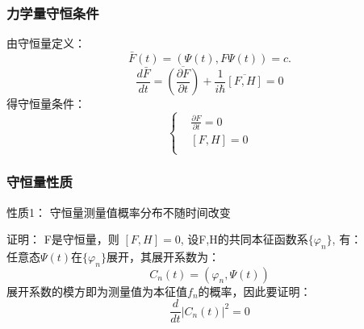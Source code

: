 \begin{frame} [allowframebreaks=]
        \frametitle{力学量守恒条件} 
        由守恒量定义：   
        $$ \bar{F}(t)=(\Psi(t), F\Psi(t)) =c.  $$
        $$\frac{d\bar{F}}{dt}=\overline{(\frac{\partial F }{\partial t})}  +\frac{1}{i\hbar} \overline{[F,H]}=0$$
        得守恒量条件：
        $$\left\{\begin{aligned}
            &\frac{\partial F }{\partial t}=0\\
            &[F,H]=0 \\
        \end{aligned} \right. $$
\end{frame}

\begin{frame} 
    \frametitle{守恒量性质} 
    \begin{tcolorbox1}{性质1：}
        守恒量测量值概率分布不随时间改变
    \end{tcolorbox1}
    \alert{证明：} F是守恒量，则 $[F,H]=0$, 设F,H的共同本征函数系$\{\varphi_n\}$, 有：\\ 
    任意态$\Psi(t)$在$\{\varphi_n\}$展开，其展开系数为：
    $$C_n(t)=(\varphi_n, \Psi(t))$$
    展开系数的模方即为测量值为本征值$f_n$的概率，因此要证明：
    $$\frac{d}{dt} |C_n(t)|^2=0$$
\end{frame}


